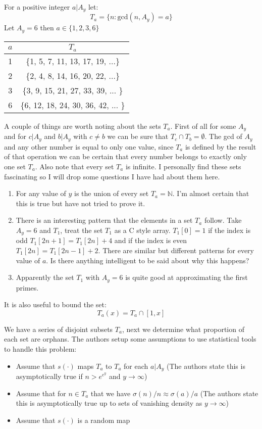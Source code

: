 \documentclass[12pt]{amsart}
\theoremstyle{definition}
\numberwithin{equation}{section}
\begin{document}
 For a positive integer $a | A_y$ let:
$$T_a = \{n : \text{gcd}(n, A_y) = a\}$$
Let $A_y = 6$ then $a \in \{1,2,3,6\}$

\begin{center}
\begin{tabular}{ |c|c|} 
 \hline
 $a$ & $T_a$\\ 
 \hline
 1 & \{1, 5, 7, 11, 13, 17, 19, ...\}\\ 
 \hline
 2 & \{2, 4, 8, 14, 16, 20, 22, ...\}\\ 
 \hline
 3 & \{3, 9, 15, 21, 27, 33, 39, ...  \}\\ 
 \hline
 6 & \{6, 12, 18, 24, 30, 36, 42, ... \}\\ 
 \hline

\end{tabular}
\end{center}

A couple of things are worth noting about the sets $T_a$. First of all for some $A_y$ and for $c | A_y$ and $b | A_y$ with $c \neq b$ we can be sure that $T_c \cap T_b = \emptyset $. The gcd of $A_y$ and any other number is equal to only one value, since $T_a$ is defined by the result of that operation we can be certain that every number belongs to exactly only one set $T_a$. Also note that every set $T_a$ is infinite. I personally find these sets fascinating so I will drop some questions I have had about them here.
\begin{enumerate}
    \item For any value of $y$ is the union of every set $T_a = \mathbb{N}$. I'm almost certain that this is true but have not tried to prove it.
    \item There is an interesting pattern that the elements in a set $T_a$ follow. Take $A_y = 6$ and $T_1$, treat the set $T_1$ as a C style array. $T_1[0] = 1$ if the index is odd $T_1[2n+1] = T_1[2n] + 4$ and if the index is even $T_1[2n] = T_1[2n-1]+2$. There are similar but different patterns for every value of $a$. Is there anything intelligent to be said about why this happens?
    \item Apparently the set $T_1$ with $A_y = 6$ is quite good at approximating the first primes.  
\end{enumerate}

It is also useful to bound the set: $$T_a(x) = T_a \cap [1,x]$$

We have a series of disjoint subsets $T_a$, next we determine what proportion of each set are orphans. The authors setup some assumptions to use statistical tools to handle this problem:
\begin{itemize}
    \item Assume that $s(\cdot)$ maps $T_a$ to $T_a$ for each $a | A_y$ (The authors state this is asymptotically true if $n > e^{e^y}$ and $y \to \infty$)
    \item Assume that for $n \in T_a $ that we have $\sigma(n)/n \approx \sigma(a)/a $ (The authors state this is asymptotically true up to sets of vanishing density as $y \to \infty$)
    \item Assume that $s(\cdot)$ is a random map
\end{itemize}
\end{document}
